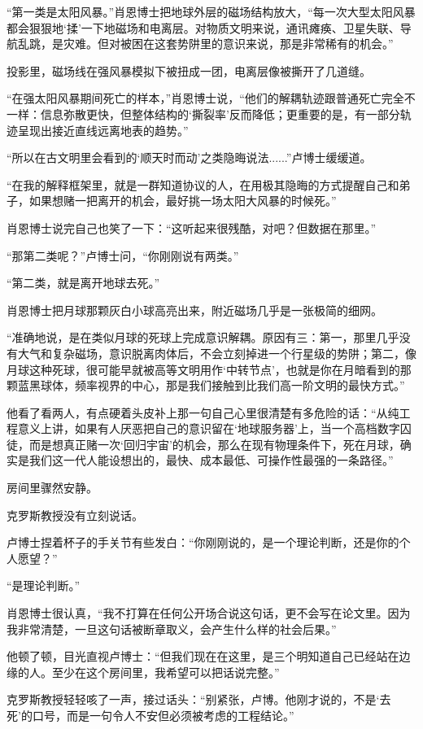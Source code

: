 “第一类是太阳风暴。”肖恩博士把地球外层的磁场结构放大，“每一次大型太阳风暴都会狠狠地‘揉’一下地磁场和电离层。对物质文明来说，通讯瘫痪、卫星失联、导航乱跳，是灾难。但对被困在这套势阱里的意识来说，那是非常稀有的机会。”

投影里，磁场线在强风暴模拟下被扭成一团，电离层像被撕开了几道缝。

“在强太阳风暴期间死亡的样本，”肖恩博士说，“他们的解耦轨迹跟普通死亡完全不一样：信息弥散更快，但整体结构的‘撕裂率’反而降低；更重要的是，有一部分轨迹呈现出接近直线远离地表的趋势。”

“所以在古文明里会看到的‘顺天时而动’之类隐晦说法......”卢博士缓缓道。

“在我的解释框架里，就是一群知道协议的人，在用极其隐晦的方式提醒自己和弟子，如果想赌一把离开的机会，最好挑一场太阳大风暴的时候死。”

肖恩博士说完自己也笑了一下：“这听起来很残酷，对吧？但数据在那里。”

“那第二类呢？”卢博士问，“你刚刚说有两类。”

“第二类，就是离开地球去死。”

肖恩博士把月球那颗灰白小球高亮出来，附近磁场几乎是一张极简的细网。

“准确地说，是在类似月球的死球上完成意识解耦。原因有三：第一，那里几乎没有大气和复杂磁场，意识脱离肉体后，不会立刻掉进一个行星级的势阱；第二，像月球这种死球，很可能早就被高等文明用作‘中转节点’，也就是你在月暗看到的那颗蓝黑球体，频率视界的中心，那是我们接触到比我们高一阶文明的最快方式。”

他看了看两人，有点硬着头皮补上那一句自己心里很清楚有多危险的话：“从纯工程意义上讲，如果有人厌恶把自己的意识留在‘地球服务器’上，当一个高档数字囚徒，而是想真正赌一次‘回归宇宙’的机会，那么在现有物理条件下，死在月球，确实是我们这一代人能设想出的，最快、成本最低、可操作性最强的一条路径。”

房间里骤然安静。

克罗斯教授没有立刻说话。

卢博士捏着杯子的手关节有些发白：“你刚刚说的，是一个理论判断，还是你的个人愿望？”

“是理论判断。”

肖恩博士很认真，“我不打算在任何公开场合说这句话，更不会写在论文里。因为我非常清楚，一旦这句话被断章取义，会产生什么样的社会后果。”

他顿了顿，目光直视卢博士：“但我们现在在这里，是三个明知道自己已经站在边缘的人。至少在这个房间里，我希望可以把话说完整。”

克罗斯教授轻轻咳了一声，接过话头：“别紧张，卢博。他刚才说的，不是‘去死’的口号，而是一句令人不安但必须被考虑的工程结论。”

